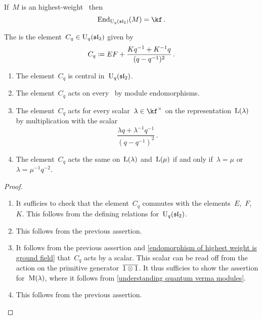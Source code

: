 \documentclass[a4paper, 11pt, oneside]{scrartcl}
\begin{document}
\begin{lemma}
  \label{endomorphism of highest weight is ground field}
  If~$M$ is an highest-weight~ then
  \[
    \End_{\Univ_q(\sllie_2)}(M) = \kf \,.
  \]
\end{lemma}

\begin{definition}
  The  is the element~$C_q \in \operatorname{U}_q(\mathfrak{sl}_2)$ given by
  \[
    C_q
    \coloneqq
    EF + \frac{ K q^{-1} + K^{-1} q }{ (q - q^{-1})^2 } \,.
  \]
\end{definition}

\begin{lemma}
  \label{action of the quantum casimir element}
  \leavevmode
  \begin{enumerate}
    \item
      The element~$C_q$ is central in~$\operatorname{U}_q(\mathfrak{sl}_2)$.
    \item
      The element~$C_q$ acts on every~ by module endomorphisms.
    \item
      The element~$C_q$ acts for every scalar~$\lambda \in \kf^\times$ on the representation~$\operatorname{L}(\lambda)$ by multiplication with the scalar
      \[
        \frac{\lambda q + \lambda^{-1} q^{-1}}{ (q - q^{-1})^2 } \,.
      \]
    \item
      The element~$C_q$ acts the same on~$\operatorname{L}(\lambda)$ and~$\operatorname{L}(\mu)$ if and only if~$\lambda = \mu$ or~$\lambda = \mu^{-1} q^{-2}$.
  \end{enumerate}
\end{lemma}

\begin{proof}
  \leavevmode
  \begin{enumerate}
    \item
      It sufficies to check that the element~$C_q$ commutes with the elements~$E$,~$F$,~$K$.
      This follows from the defining relations for~$\operatorname{U}_q(\mathfrak{sl}_2)$.
    \item
      This follows from the previous assertion.
    \item
      It follows from the previous assertion and \cref{endomorphism of highest weight is ground field} that~$C_q$ acts by a scalar.
      This scalar can be read off from the action on the primitive generator~$\overline{1 \otimes 1}$.
      It thus sufficies to show the assertion for~$\operatorname{M}(\lambda)$, where it follows from \cref{understanding quantum verma modules}.
    \item
      This follows from the previous assertion.
    \qedhere
  \end{enumerate}
\end{proof}
\end{document}
